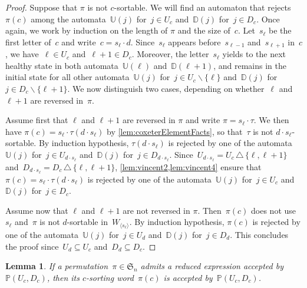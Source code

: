 \documentclass{amsart}
\newtheorem{lemma}[theorem]{Lemma}
\newcommand{\fS}{\mathfrak{S}} %
\newcommand{\ssm}{\smallsetminus} %
\newcommand{\symdif}{\,\triangle\,} %
\newcommand{\automatonP}{\mathbb{P}} %
\newcommand{\automatonU}{\mathbb{U}} %
\newcommand{\automatonD}{\mathbb{D}} %
\begin{document}
\begin{proof}
Suppose that $\pi$ is not $c$-sortable. We will find an automaton that rejects $\pi(c)$ among the automata~$\automatonU(j)$ for~$j \in U_c$ and~$\automatonD(j)$ for~$j \in D_c$.
Once again, we work by induction on the length of $\pi$ and the size of~$c$.
Let~$s_\ell$ be the first letter of~$c$ and write~$c = s_\ell \cdot d$.
Since~$s_\ell$ appears before~$s_{\ell-1}$ and~$s_{\ell+1}$ in~$c$, we have~$\ell \in U_c$ and~$\ell+1 \in D_c$.
Moreover, the letter~$s_\ell$ yields to the next healthy state in both automata~$\automatonU(\ell)$ and~$\automatonD(\ell+1)$, and remains in the initial state for all other automata~$\automatonU(j)$ for~$j \in U_c \ssm \{\ell\}$ and~$\automatonD(j)$ for~$j \in D_c \ssm \{\ell+1\}$.
We now distinguish two cases, depending on whether~$\ell$ and~$\ell+1$ are reversed in~$\pi$.

Assume first that $\ell$ and $\ell+1$ are reversed in $\pi$ and write $\pi = s_\ell \cdot \tau$.
We then have $\pi(c) = s_\ell \cdot \tau(d \cdot s_\ell)$ by \cref{lem:coxeterElementFacts}, so that~$\tau$ is not $d \cdot s_\ell$-sortable.
By induction hypothesis, $\tau(d \cdot s_\ell)$ is rejected by one of the automata~$\automatonU(j)$ for~$j \in U_{d \cdot s_\ell}$ and~$\automatonD(j)$ for~$j \in D_{d \cdot s_\ell}$.
Since~$U_{d \cdot s_\ell} = U_c \symdif \{\ell, \ell+1\}$ and~$D_{d \cdot s_\ell} = D_c \symdif \{\ell, \ell+1\}$, \cref{lem:vincent2,lem:vincent4} ensure that $\pi(c) = s_\ell \cdot \tau(d \cdot s_\ell)$ is rejected by one of the automata~$\automatonU(j)$ for~$j \in U_c$ and~$\automatonD(j)$ for~$j \in D_c$.

Assume now that $\ell$ and $\ell+1$ are not reversed in $\pi$.
Then~$\pi(c)$ does not use~$s_\ell$ and~$\pi$ is not $d$-sortable in~$W_{\langle s_\ell \rangle}$.
By induction hypothesis, $\pi(c)$ is rejected by one of the automata~$\automatonU(j)$ for~$j \in U_d$ and~$\automatonD(j)$ for~$j \in D_d$.
This concludes the proof since~$U_d \subseteq U_c$ and~$D_d \subseteq D_c$.
\end{proof}

\begin{lemma}\label{lem:Vincent11}
If a permutation~$\pi \in \fS_n$ admits a reduced expression accepted by~$\automatonP(U_c, D_c)$, then its $c$-sorting word~$\pi(c)$ is accepted by~$\automatonP(U_c, D_c)$.
\end{lemma}
\end{document}

